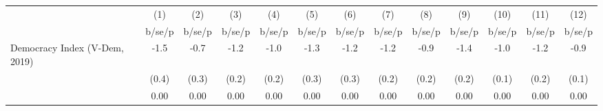 \begin{tabular}{l*{12}{c}}
\hline\hline
                    &\multicolumn{1}{c}{(1)}&\multicolumn{1}{c}{(2)}&\multicolumn{1}{c}{(3)}&\multicolumn{1}{c}{(4)}&\multicolumn{1}{c}{(5)}&\multicolumn{1}{c}{(6)}&\multicolumn{1}{c}{(7)}&\multicolumn{1}{c}{(8)}&\multicolumn{1}{c}{(9)}&\multicolumn{1}{c}{(10)}&\multicolumn{1}{c}{(11)}&\multicolumn{1}{c}{(12)}\\
                    &      b/se/p&      b/se/p&      b/se/p&      b/se/p&      b/se/p&      b/se/p&      b/se/p&      b/se/p&      b/se/p&      b/se/p&      b/se/p&      b/se/p\\
\hline
Democracy Index (V-Dem, 2019)&        -1.5&        -0.7&        -1.2&        -1.0&        -1.3&        -1.2&        -1.2&        -0.9&        -1.4&        -1.0&        -1.2&        -0.9\\
                    &       (0.4)&       (0.3)&       (0.2)&       (0.2)&       (0.3)&       (0.3)&       (0.2)&       (0.2)&       (0.2)&       (0.1)&       (0.2)&       (0.1)\\
                    &        0.00&        0.00&        0.00&        0.00&        0.00&        0.00&        0.00&        0.00&        0.00&        0.00&        0.00&        0.00\\
\hline\hline
\end{tabular}
